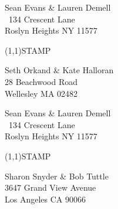 \documentclass[12pt]{article}
\begin{document}
\begin{minipage}{.5\linewidth} \noindent
Sean Evans \& Lauren Demell\\\ 
134 Crescent Lane\\ 
Roslyn Heights NY 11577
\end{minipage}
\begin{minipage}{.5\linewidth \hspace{-.2in} \vspace{-.3in}}
\begin{flushright}
\framebox(1,1){STAMP}
\end{flushright}
\end{minipage}

\begin{center} \begin{Huge} \vspace*{\fill}
Seth Orkand \& Kate Halloran\\
28 Beachwood Road\\
Wellesley MA 02482\\
\vspace{\fill} \end{Huge} \end{center}

\clearpage

\begin{minipage}{.5\linewidth} \noindent
Sean Evans \& Lauren Demell\\\ 
134 Crescent Lane\\ 
Roslyn Heights NY 11577
\end{minipage}
\begin{minipage}{.5\linewidth \hspace{-.2in} \vspace{-.3in}}
\begin{flushright}
\framebox(1,1){STAMP}
\end{flushright}
\end{minipage}

\begin{center} \begin{Huge} \vspace*{\fill}
Sharon Snyder \& Bob Tuttle\\
3647 Grand View Avenue\\
Los Angeles CA 90066\\
\vspace{\fill} \end{Huge} \end{center}

\clearpage
\end{document}
